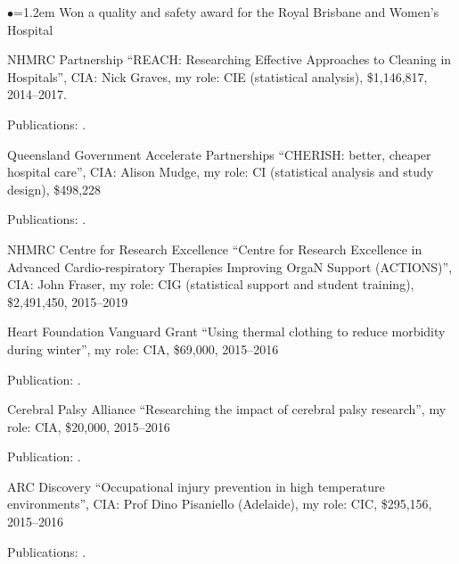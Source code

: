 \documentclass[a4paper,11pt]{article}
\renewcommand{\labelitemi}{$\bullet$}
\begin{document}
\begin{raggedright}
\begin{list}{\labelitemi}{\leftmargin=1.2em}
Won a quality and safety award for the Royal Brisbane and Women's Hospital

\item NHMRC Partnership ``REACH: Researching Effective Approaches to Cleaning in Hospitals'', CIA: Nick Graves, my role: CIE (statistical analysis), \$1,146,817, 2014--2017.

    Publications: .

\item Queensland Government Accelerate Partnerships ``CHERISH: better, cheaper hospital care'', CIA: Alison Mudge, my role: CI (statistical analysis and study design), \$498,228 %

    Publications: .

\item NHMRC Centre for Research Excellence ``Centre for Research Excellence in Advanced Cardio-respiratory Therapies Improving OrgaN Support (ACTIONS)'', CIA: John Fraser, my role: CIG (statistical support and student training), \$2,491,450, 2015--2019

\item Heart Foundation Vanguard Grant ``Using thermal clothing to reduce morbidity during winter'', my role: CIA, \$69,000, 2015--2016

   Publication: .

\item Cerebral Palsy Alliance ``Researching the impact of cerebral palsy research'', my role: CIA, \$20,000, 2015--2016

   Publication: .

\item ARC Discovery ``Occupational injury prevention in high temperature environments'', CIA: Prof Dino Pisaniello (Adelaide), my role: CIC, \$295,156, 2015--2016

   Publications: .


\end{list}
\end{raggedright}
\end{document}
